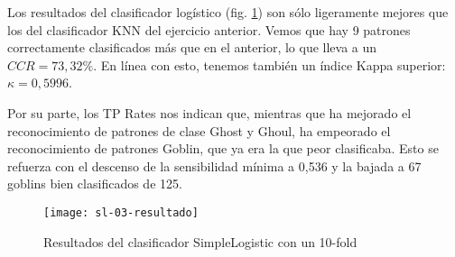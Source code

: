 Los resultados del clasificador logístico (fig. \ref{fig:sl-resultados}) son sólo ligeramente mejores que los del clasificador KNN del ejercicio anterior. Vemos que hay 9 patrones correctamente clasificados más que en el anterior, lo que lleva a un $CCR=73,32\%$. En línea con esto, tenemos también un índice Kappa superior: $\kappa=0,5996$.

Por su parte, los TP Rates nos indican que, mientras que ha mejorado el reconocimiento de patrones de clase Ghost y Ghoul, ha empeorado el reconocimiento de patrones Goblin, que ya era la que peor clasificaba. Esto se refuerza con el descenso de la sensibilidad mínima a 0,536 y la bajada a 67 goblins bien clasificados de 125.

\begin{figure}[ht]
    \centering
    \texttt{[image: sl-03-resultado]}
    \caption{Resultados del clasificador SimpleLogistic con un 10-fold}
    \label{fig:sl-resultados}
\end{figure}